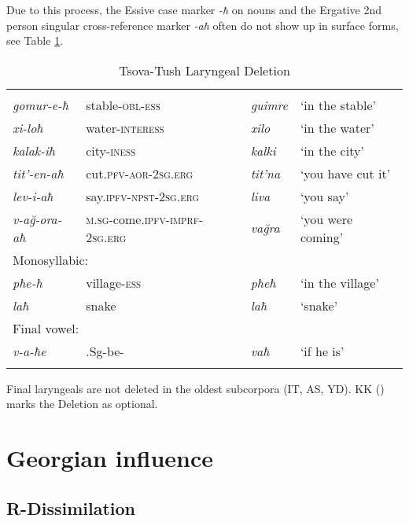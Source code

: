 Due to this process, the Essive case marker \textit{-ħ} on nouns and the Ergative 2nd person singular cross-reference marker \textit{-aħ} often do not show up in surface forms, see Table \ref{table-laryng}. 


\begin{table}
	\begin{tabular}{llll}
		\lsptoprule
		\multicolumn{4}{l}{Polysyllabic:}\\
		\textit{gomur-e-ħ} & stable-\textsc{obl-ess} & \textit{guimre} & `in the stable' \\
		\textit{xi-loħ} & water-\textsc{interess} & \textit{xilo} & `in the water' \\
		\textit{kalak-iħ} & city-\textsc{iness} & \textit{kalki} & `in the city' \\
		
		\textit{tit'-en-aħ} & cut.\textsc{pfv-aor-2sg.erg} & \textit{tit'na} & `you have cut it' \\
		\textit{lev-i-aħ} & say.\textsc{ipfv-npst-2sg.erg} & \textit{liva} & `you say' \\
		\textit{v-a\u{g}-ora-aħ} & \textsc{m.sg}-come.\textsc{ipfv-imprf-2sg.erg} & \textit{va\u{g}ra} & `you were coming' \\\midrule
		
		\multicolumn{4}{l}{Monosyllabic:}\\
		\textit{pħe-ħ} & village-\textsc{ess} & \textit{pħeħ} & `in the village' \\
		\textit{laħ} & snake & \textit{laħ} & `snake' \\\midrule
		\multicolumn{4}{l}{Final vowel:}\\
		\textit{v-a-ħe} & {\M}.{Sg}-be-{\Cond} & \textit{vaħ} & `if he is' \\
		\lspbottomrule
	\end{tabular}
	\caption{Tsova-Tush Laryngeal Deletion}
	\label{table-laryng}
\end{table}

Final laryngeals are not deleted in the oldest subcorpora (IT, AS, YD). KK (\cite{kadkad84}) marks the Deletion as optional.




\section{Georgian influence} \label{georgianphon}

\subsection{R-Dissimilation} \label{rdissim}
\largerpage

